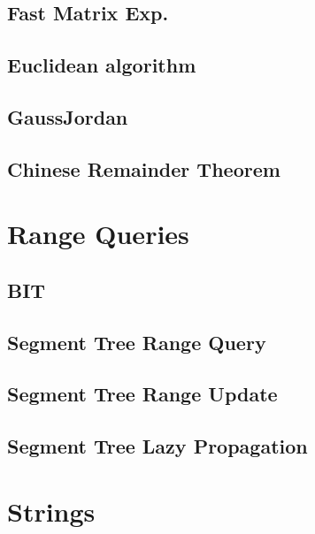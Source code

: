 \subsection{ Fast Matrix Exp.}
\raggedbottom
\hrulefill
\subsection{  Euclidean algorithm}
\raggedbottom
\hrulefill
\subsection{  GaussJordan}
\raggedbottom
\hrulefill
\subsection{   Chinese Remainder Theorem}
\raggedbottom
\hrulefill

\section{Range Queries}
\subsection{BIT}
\raggedbottom
\hrulefill
\subsection{   Segment Tree Range Query}
\raggedbottom
\hrulefill
\subsection{  Segment Tree Range Update}
\raggedbottom
\hrulefill
\subsection{Segment Tree Lazy Propagation}
\raggedbottom
\hrulefill

\section{Strings}

